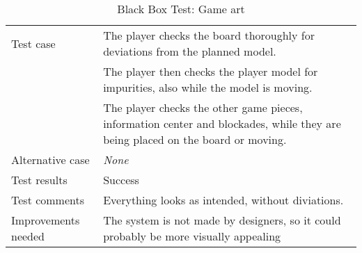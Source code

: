 {\begin{table}[H]
\begin{tabular}{| p{5cm} | p{10cm} |}
	Test case
		& The player checks the board thoroughly for deviations from the planned model.\\
		& The player then checks the player model for impurities, also while the model is moving.\\
		& The player checks the other game pieces, information center and blockades, 
			while they are being placed on the board or moving.\\ \hline
	Alternative case
		& \emph{None}\\ \hline
	Test results 
		& Success \\ \hline
	Test comments
		& Everything looks as intended, without diviations. \\ \hline
	Improvements needed
		& The system is not made by designers, so it could probably be more visually appealing \\ \hline
\end{tabular}


\caption{Black Box Test: Game art}
\label{fig:black_box_test_3}
\end{table}}


